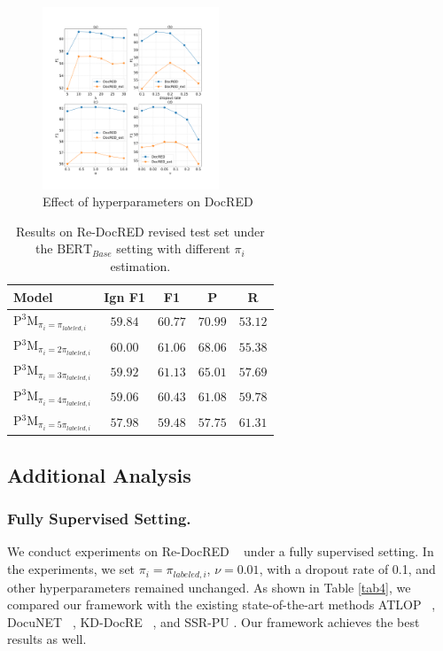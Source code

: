 \documentclass[letterpaper]{article} %
\begin{document}
\begin{figure}
\centering
\includegraphics[width=0.47\textwidth]{hyperparameters.pdf}
\caption{Effect of hyperparameters on DocRED}
\label{fig2}
\end{figure}

\begin{table}
\centering
\begin{tabular}{lcccc}
\toprule \textbf{Model} & Ign F1 & F1 & P & R \\
\midrule
P$^{3}$M$_{\pi_{i}=\pi_{labeled,i}}$& $59.84$ & $60.77$ & $70.99$ & $53.12$ \\
P$^{3}$M$_{\pi_{i}=2\pi_{labeled,i}}$ & $60.00$ & $61.06$ & $68.06$ & $55.38$ \\
P$^{3}$M$_{\pi_{i}=3\pi_{labeled,i}}$ & $59.92$ & $61.13$ & $65.01$ & $57.69$ \\
P$^{3}$M$_{\pi_{i}=4\pi_{labeled,i}}$ & $59.06$ & $60.43$ & $61.08$ & $59.78$ \\
P$^{3}$M$_{\pi_{i}=5\pi_{labeled,i}}$ & $57.98$ & $59.48$ & $57.75$ & $61.31$ \\
\bottomrule
\end{tabular}
\caption{
Results on Re-DocRED revised test set under the $\mathrm{BERT}_{Base}$ setting with different $\pi_{i}$ estimation.
}
\label{tab5}
\end{table}

\subsection{Additional Analysis}

\subsubsection{Fully Supervised Setting.}
We conduct experiments on Re-DocRED ~\cite{DBLP:conf/emnlp/Tan0BNA22} under a fully supervised setting. In the experiments, we set $\pi_{i}=\pi_{labeled,i}$, $\nu=0.01$, with a dropout rate of 0.1, and other hyperparameters remained unchanged. As shown in Table \ref{tab4}, we compared our framework with the existing state-of-the-art methods ATLOP ~\cite{DBLP:conf/aaai/Zhou0M021}, DocuNET ~\cite{DBLP:conf/ijcai/ZhangCXDTCHSC21}, KD-DocRE ~\cite{DBLP:conf/acl/TanHBN22}, and SSR-PU \cite{DBLP:conf/emnlp/WangLHZ22}. Our framework achieves the best results as well.
\end{document}
